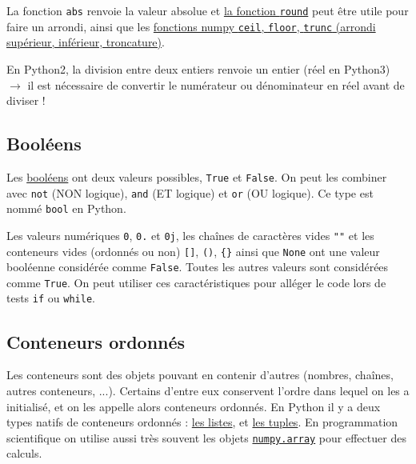 \documentclass{article}
\begin{document}
La fonction \texttt{abs} renvoie la valeur absolue et \href{https://docs.python.org/fr/3.5/library/functions.html#round}{la fonction \texttt{round}} peut être utile pour faire un arrondi, ainsi que les \href{https://docs.scipy.org/doc/numpy/reference/routines.math.html#rounding}{fonctions numpy \texttt{ceil}, \texttt{floor}, \texttt{trunc} (arrondi supérieur, inférieur, troncature)}.

En Python2, la division entre deux entiers renvoie un entier (réel en Python3) $\to$ il est nécessaire de convertir le numérateur ou dénominateur en réel avant de diviser !

\subsection*{Booléens}
Les \href{https://fr.wikibooks.org/wiki/Programmation_Python/Bool\%C3\%A9ens}{booléens} ont deux valeurs possibles, \texttt{True} et \texttt{False}. On peut les combiner avec \texttt{not} (NON logique), \texttt{and} (ET logique) et \texttt{or} (OU logique). Ce type est nommé \texttt{bool} en Python.

Les valeurs numériques \texttt{0}, \texttt{0.} et \texttt{0j}, les chaînes de caractères vides \texttt{""} et les conteneurs vides (ordonnés ou non) \texttt{[]}, \texttt{()}, \texttt{\{\}} ainsi que \texttt{None} ont une valeur booléenne considérée comme \texttt{False}. Toutes les autres valeurs sont considérées comme \texttt{True}. On peut utiliser ces caractéristiques pour alléger le code lors de tests \texttt{if} ou \texttt{while}.

\subsection{Conteneurs ordonnés}
Les conteneurs sont des objets pouvant en contenir d'autres (nombres, chaînes, autres conteneurs, ...). Certains d'entre eux conservent l'ordre dans lequel on les a initialisé, et on les appelle alors conteneurs ordonnés. En Python il y a deux types natifs de conteneurs ordonnés : \href{https://fr.wikibooks.org/wiki/Programmation_Python/Listes}{les listes},  et \href{https://fr.wikibooks.org/wiki/Programmation_Python/Tuples}{les tuples}. En programmation scientifique on utilise aussi très souvent les objets \href{https://docs.scipy.org/doc/numpy/reference/arrays.html}{\texttt{numpy.array}} pour effectuer des calculs.
\end{document}

